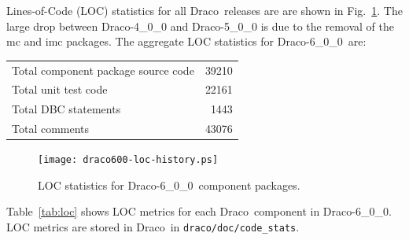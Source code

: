 \documentclass[note]{ResearchNote}
\newcommand{\draco}{Draco}
\newcommand{\dracor}{\draco-6\_0\_0}
\begin{document}
Lines-of-Code (LOC) statistics for all \draco\ releases are are shown
in Fig.~\ref{fig:stats}.  The large drop between \draco-4\_0\_0 and
\draco-5\_0\_0 is due to the removal of the \textsf{mc} and
\textsf{imc} packages. The aggregate LOC statistics for \dracor\ are:
\begin{center}
  \begin{tabular}{|l|r|} \hline
    Total component package source code & 39210 \\
    Total unit test code & 22161 \\
    Total DBC statements & 1443 \\
    Total comments & 43076 \\
    \hline
  \end{tabular}
\end{center}
\begin{figure}
  \label{fig:stats}
  \centerline{
    \texttt{[image: draco600-loc-history.ps]}}
  \caption{LOC statistics for \dracor\ component packages.}
\end{figure}
Table~\ref{tab:loc} shows LOC metrics for each \draco\ component in
\dracor.  LOC metrics are stored in \draco\ in
\texttt{draco/doc/code\_stats}.
\end{document}
